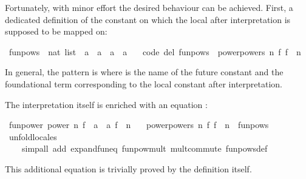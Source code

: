 \begin{isabellebody}
\begin{isamarkuptext}
  Fortunately, with minor effort the desired behaviour can be achieved.
  First, a dedicated definition of the constant on which the local 
  after interpretation is supposed to be mapped on:%
\end{isamarkuptext}%
\isamarkuptrue%
%
\isadelimquote
%
\endisadelimquote
%
\isatagquote
{}\isamarkupfalse%
\ funpows\ {\isacharcolon}{\isacharcolon}\ {\isachardoublequoteopen}nat\ list\ {\isasymRightarrow}\ {\isacharparenleft}{\isacharprime}a\ {\isasymRightarrow}\ {\isacharprime}a{\isacharparenright}\ {\isasymRightarrow}\ {\isacharprime}a\ {\isasymRightarrow}\ {\isacharprime}a{\isachardoublequoteclose}\ \isanewline
\ \ {\isacharbrackleft}code\ del{\isacharbrackright}{\isacharcolon}\ {\isachardoublequoteopen}funpows\ {\isacharequal}\ power{\isachardot}powers\ {\isacharparenleft}{\isasymlambda}n\ f{\isachardot}\ f\ {\isacharcircum}{\isacharcircum}\ n{\isacharparenright}{\isachardoublequoteclose}%
\endisatagquote
{\isafoldquote}%
%
\isadelimquote
%
\endisadelimquote
%
\begin{isamarkuptext}%
\noindent In general, the pattern is  where  is
  the name of the future constant and  the foundational term
  corresponding to the local constant after interpretation.

  The interpretation itself is enriched with an equation :%
\end{isamarkuptext}%
\isamarkuptrue%
%
\isadelimquote
%
\endisadelimquote
%
\isatagquote
{}\isamarkupfalse%
\ fun{\isacharunderscore}power{\isacharcolon}\ power\ {\isachardoublequoteopen}{\isasymlambda}n\ {\isacharparenleft}f\ {\isacharcolon}{\isacharcolon}\ {\isacharprime}a\ {\isasymRightarrow}\ {\isacharprime}a{\isacharparenright}{\isachardot}\ f\ {\isacharcircum}{\isacharcircum}\ n{\isachardoublequoteclose}\ \isanewline
\ \ {\isachardoublequoteopen}power{\isachardot}powers\ {\isacharparenleft}{\isasymlambda}n\ f{\isachardot}\ f\ {\isacharcircum}{\isacharcircum}\ n{\isacharparenright}\ {\isacharequal}\ funpows{\isachardoublequoteclose}\isanewline
\ \ \isamarkupfalse%
\ unfold{\isacharunderscore}locales\isanewline
\ \ \ \ {\isacharparenleft}simp{\isacharunderscore}all\ add{\isacharcolon}\ expand{\isacharunderscore}fun{\isacharunderscore}eq\ funpow{\isacharunderscore}mult\ mult{\isacharunderscore}commute\ funpows{\isacharunderscore}def{\isacharparenright}%
\endisatagquote
{\isafoldquote}%
%
\isadelimquote
%
\endisadelimquote
%
\begin{isamarkuptext}%
\noindent This additional equation is trivially proved by the definition
  itself.


\end{isamarkuptext}
\end{isabellebody}
